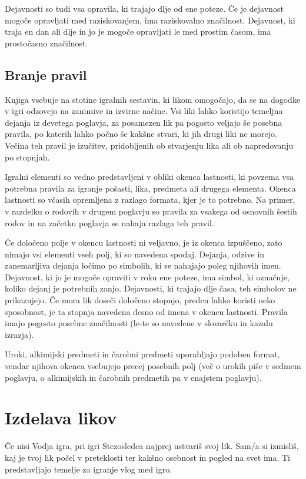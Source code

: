 Dejavnosti so tudi vsa opravila, ki trajajo dlje od ene poteze. Če je dejavnost mogoče opravljati med raziskovanjem, ima raziskovalno značilnost. Dejavnost, ki traja en dan ali dlje in jo je mogoče opravljati le med prostim časom, ima prostočasno značilnost.

\subsection{Branje pravil}
Knjiga vsebuje na stotine igralnih sestavin, ki likom omogočajo, da se na dogodke v igri odzovejo na zanimive in izvirne načine. Vsi liki lahko koristijo temeljna dejanja iz devetega poglavja, za posamezen lik pa pogosto veljajo še posebna pravila, po katerih lahko počno še kakšne stvari, ki jih drugi liki ne morejo. Večina teh pravil je izučitev, pridobljenih ob stvarjenju lika ali ob napredovanju po stopnjah.

Igralni elementi so vedno predstavljeni v obliki okenca lastnosti, ki povzema vsa potrebna pravila za igranje pošasti, lika, predmeta ali drugega elementa. Okenca lastnosti so včasih opremljena z razlago formata, kjer je to potrebno. Na primer, v razdelku o rodovih v drugem poglavju so pravila za vsakega od osnovnih šestih rodov in na začetku poglavja se nahaja razlaga teh pravil.

Če določeno polje v okencu lastnosti ni veljavno, je iz okenca izpuščeno, zato nimajo vsi elementi vseh polj, ki so navedena spodaj. Dejanja, odzive in zanemarljiva dejanja ločimo po simbolih, ki se nahajajo poleg njihovih imen. Dejavnost, ki jo je mogoče opraviti v roku ene poteze, ima simbol, ki označuje, koliko dejanj je potrebnih zanjo. Dejavnosti, ki trajajo dlje časa, teh simbolov ne prikazujejo. Če mora lik doseči določeno stopnjo, preden lahko koristi neko sposobnost, je ta stopnja navedena desno od imena v okencu lastnosti. Pravila imajo pogosto posebne značilnosti (le-te so navedene v slovarčku in kazalu izrazja).

Uroki, alkimijski predmeti in čarobni predmeti uporabljajo podoben format, vendar njihova okenca vsebujejo precej posebnih polj (več o urokih piše v sedmem poglavju, o alkimijskih in čarobnih predmetih pa v enajstem poglavju).

\section{Izdelava likov}
Če nisi Vodja igra, pri igri Stezosledca najprej ustvariš svoj lik. Sam/a si izmisliš, kaj je tvoj lik počel v preteklosti ter kakšno osebnost in pogled na svet ima. Ti predstavljajo temelje za igranje vlog med igro.